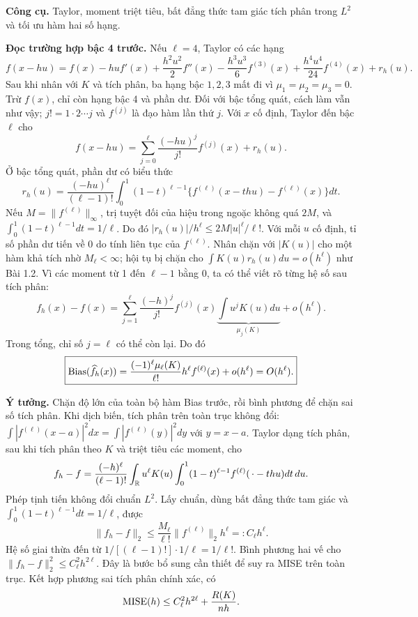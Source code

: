 \textbf{Công cụ.} Taylor, moment triệt tiêu, bất đẳng thức tam giác tích phân trong $L^2$ và tối ưu hàm hai số hạng.

\textbf{Đọc trường hợp bậc 4 trước.} Nếu $\ell=4$, Taylor có các hạng
\[
f(x-hu)=f(x)-hu f'(x)+\frac{h^2u^2}{2}f''(x)
-\frac{h^3u^3}{6}f^{(3)}(x)+\frac{h^4u^4}{24}f^{(4)}(x)+r_h(u).
\]
Sau khi nhân với $K$ và tích phân, ba hạng bậc $1,2,3$ mất đi vì
$\mu_1=\mu_2=\mu_3=0$. Trừ $f(x)$, chỉ còn hạng bậc 4 và phần dư.
Đối với bậc tổng quát, cách làm vẫn như vậy; $j!=1\cdot2\cdots j$
và $f^{(j)}$ là đạo hàm lần thứ $j$.
Với $x$ cố định, Taylor đến bậc $\ell$ cho
\[
f(x-hu)=\sum_{j=0}^{\ell}\frac{(-hu)^j}{j!}f^{(j)}(x)+r_h(u).
\]
Ở bậc tổng quát, phần dư có biểu thức
\[
r_h(u)=\frac{(-hu)^\ell}{(\ell-1)!}
\int_0^1(1-t)^{\ell-1}
\{f^{(\ell)}(x-thu)-f^{(\ell)}(x)\}dt.
\]
Nếu $M=\|f^{(\ell)}\|_\infty$, trị tuyệt đối của hiệu trong ngoặc không quá $2M$,
và $\int_0^1(1-t)^{\ell-1}dt=1/\ell$. Do đó
$|r_h(u)|/h^\ell\leq 2M|u|^\ell/\ell!$.
Với mỗi $u$ cố định, tỉ số phần dư tiến về 0 do tính liên tục của $f^{(\ell)}$.
Nhân chặn với $|K(u)|$ cho một hàm khả tích nhờ $M_\ell<\infty$;
hội tụ bị chặn cho $\int K(u)r_h(u)du=o(h^\ell)$ như Bài 1.2.
Vì các moment từ 1 đến $\ell-1$ bằng 0,
ta có thể viết rõ từng hệ số sau tích phân:
\[
f_h(x)-f(x)=\sum_{j=1}^{\ell}
\frac{(-h)^j}{j!}f^{(j)}(x)\underbrace{\int u^jK(u)du}_{\mu_j(K)}
+o(h^\ell).
\]
Trong tổng, chỉ số $j=\ell$ có thể còn lại. Do đó
\[
\boxed{\operatorname{Bias}(\widehat f_h(x))
=\frac{(-1)^\ell\mu_\ell(K)}{\ell!}h^\ell f^{(\ell)}(x)+o(h^\ell)=O(h^\ell).}
\]

\textbf{Ý tưởng.} Chặn độ lớn của toàn bộ hàm Bias trước, rồi bình phương
để chặn sai số tích phân. Khi dịch biến, tích phân trên toàn trục không đổi:
$\int|f^{(\ell)}(x-a)|^2dx=\int|f^{(\ell)}(y)|^2dy$ với $y=x-a$.
Taylor dạng tích phân, sau khi tích phân theo $K$ và triệt tiêu các moment, cho
\[
f_h-f=\frac{(-h)^\ell}{(\ell-1)!}
\int_{\mathbb R}u^\ell K(u)\int_0^1(1-t)^{\ell-1}
f^{(\ell)}(\,\cdot-thu)dt\,du.
\]
Phép tịnh tiến không đổi chuẩn $L^2$. Lấy chuẩn, dùng bất đẳng thức tam giác
và $\int_0^1(1-t)^{\ell-1}dt=1/\ell$, được
\[
\|f_h-f\|_2\leq\frac{M_\ell}{\ell!}\|f^{(\ell)}\|_2h^\ell=:C_\ell h^\ell.
\]
Hệ số giai thừa đến từ
$1/[(\ell-1)!]\cdot1/\ell=1/\ell!$.
Bình phương hai vế cho $\|f_h-f\|_2^2\leq C_\ell^2h^{2\ell}$.
Đây là bước bổ sung cần thiết để suy ra MISE trên toàn trục.
Kết hợp phương sai tích phân chính xác, có
\[
\operatorname{MISE}(h)\leq C_\ell^2h^{2\ell}+\frac{R(K)}{nh}.
\]


